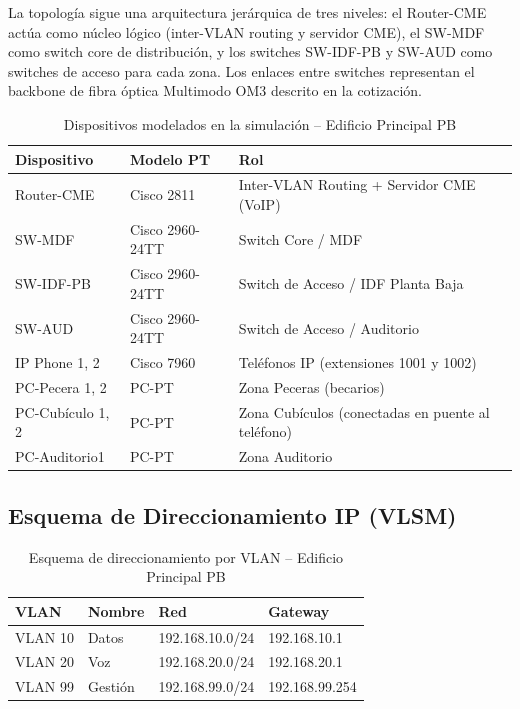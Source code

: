 \documentclass[11pt, letterpaper]{article}
\begin{document}
La topología sigue una arquitectura jerárquica de tres niveles: el Router-CME actúa como núcleo lógico (inter-VLAN routing y servidor CME), el SW-MDF como switch core de distribución, y los switches SW-IDF-PB y SW-AUD como switches de acceso para cada zona. Los enlaces entre switches representan el backbone de fibra óptica Multimodo OM3 descrito en la cotización.

\begin{table}[h!]
\centering
{}
\renewcommand{\arraystretch}{1.3}
\begin{tabularx}{\textwidth}{@{} l l X @{}}
\toprule
\rowcolor{AzulUNAM!10}
\textbf{Dispositivo} & \textbf{Modelo PT} & \textbf{Rol} \\ \midrule
Router-CME & Cisco 2811 & Inter-VLAN Routing + Servidor CME (VoIP) \\
SW-MDF & Cisco 2960-24TT & Switch Core / MDF \\
SW-IDF-PB & Cisco 2960-24TT & Switch de Acceso / IDF Planta Baja \\
SW-AUD & Cisco 2960-24TT & Switch de Acceso / Auditorio \\
IP Phone 1, 2 & Cisco 7960 & Teléfonos IP (extensiones 1001 y 1002) \\
PC-Pecera 1, 2 & PC-PT & Zona Peceras (becarios) \\
PC-Cubículo 1, 2 & PC-PT & Zona Cubículos (conectadas en puente al teléfono) \\
PC-Auditorio1 & PC-PT & Zona Auditorio \\ \bottomrule
\end{tabularx}
\caption{Dispositivos modelados en la simulación -- Edificio Principal PB}
\end{table}

\subsection*{Esquema de Direccionamiento IP (VLSM)}

\begin{table}[h!]
\centering
{}
\renewcommand{\arraystretch}{1.3}
\begin{tabularx}{\textwidth}{@{} l l l l @{}}
\toprule
\rowcolor{AzulUNAM!10}
\textbf{VLAN} & \textbf{Nombre} & \textbf{Red} & \textbf{Gateway} \\ \midrule
VLAN 10 & Datos & 192.168.10.0/24 & 192.168.10.1 \\
VLAN 20 & Voz & 192.168.20.0/24 & 192.168.20.1 \\
VLAN 99 & Gestión & 192.168.99.0/24 & 192.168.99.254 \\ \bottomrule
\end{tabularx}
\caption{Esquema de direccionamiento por VLAN -- Edificio Principal PB}
\end{table}
\end{document}
